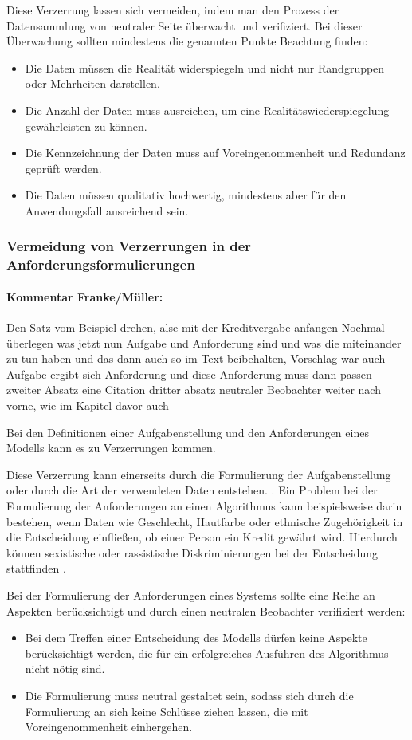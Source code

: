 \documentclass[12pt]{article}
\begin{document}
Diese Verzerrung lassen sich vermeiden, indem man den Prozess der Datensammlung von neutraler Seite überwacht und verifiziert.
Bei dieser Überwachung sollten mindestens die genannten Punkte Beachtung finden: 
\begin{itemize}
    \item Die Daten müssen die Realität widerspiegeln und nicht nur Randgruppen oder Mehrheiten darstellen.
    \item Die Anzahl der Daten muss ausreichen, um eine Realitätswiederspiegelung gewährleisten zu können.
    \item Die Kennzeichnung der Daten muss auf Voreingenommenheit und Redundanz geprüft werden.
    \item Die Daten müssen qualitativ hochwertig, mindestens aber für den Anwendungsfall ausreichend sein.
\end{itemize}

\subsubsection{Vermeidung von Verzerrungen in der Anforderungsformulierungen}
\paragraph{Kommentar Franke/Müller:}
Den Satz vom Beispiel drehen, alse mit der Kreditvergabe anfangen
Nochmal überlegen was jetzt nun Aufgabe und Anforderung sind und was die miteinander zu tun haben und das dann auch so im Text beibehalten, Vorschlag war auch Aufgabe ergibt sich Anforderung und diese Anforderung muss dann passen
zweiter Absatz eine Citation
dritter absatz neutraler Beobachter weiter nach vorne, wie im Kapitel davor auch


Bei den Definitionen einer Aufgabenstellung und den Anforderungen eines Modells kann es zu Verzerrungen kommen.

Diese Verzerrung kann einerseits durch die Formulierung der Aufgabenstellung oder durch die Art der verwendeten Daten entstehen.  \cite{Srinivasan}.
Ein Problem bei der Formulierung der Anforderungen an einen Algorithmus kann beispielsweise darin bestehen, wenn Daten wie Geschlecht, Hautfarbe oder ethnische Zugehörigkeit in die 
Entscheidung einfließen, ob einer Person ein Kredit gewährt wird. Hierdurch können sexistische oder rassistische Diskriminierungen bei der Entscheidung stattfinden \cite{Srinivasan}.

Bei der Formulierung der Anforderungen eines Systems sollte eine Reihe an Aspekten berücksichtigt und durch einen neutralen Beobachter verifiziert werden:
\begin{itemize}
    \item Bei dem Treffen einer Entscheidung des Modells dürfen keine Aspekte berücksichtigt werden, die für ein erfolgreiches Ausführen des Algorithmus nicht nötig sind.
    \item Die Formulierung muss neutral gestaltet sein, sodass sich durch die Formulierung an sich keine Schlüsse ziehen lassen, die mit Voreingenommenheit einhergehen.
\end{itemize}
\end{document}
